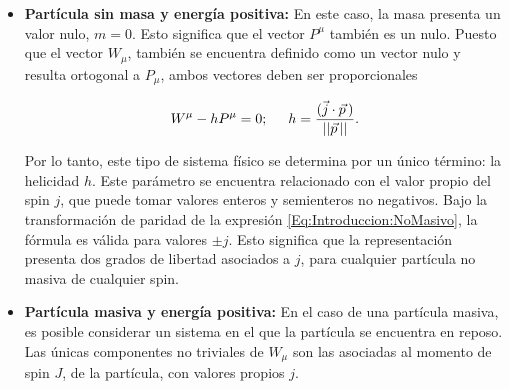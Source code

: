 \begin{itemize}
	\item \textbf{Partícula sin masa y energía positiva:} En este caso, la masa presenta un valor nulo, $m=0$. Esto significa que el vector $P^{\mu}$ también es un nulo. Puesto que el vector $W_{\mu}$, también se encuentra definido como un vector nulo y resulta ortogonal a $P_{\mu}$, ambos vectores deben ser proporcionales
	
		\begin{equation} \label{Eq:Introduccion:NoMasivo}
			W^{\mu} - h P^{\mu} = 0; \hspace{5mm} h =  \frac{ (\vec{j} \cdot \vec{p}\, ) }{ || \vec{p}\, || }.
		\end{equation}
	
	Por lo tanto, este tipo de sistema físico se determina por un único término: la helicidad $h$. Este parámetro se encuentra relacionado con el valor propio del spin $j$, que puede tomar valores enteros y semienteros no negativos. Bajo la transformación de paridad de la expresión \eqref{Eq:Introduccion:NoMasivo}, la fórmula es válida para valores $\pm j$. Esto significa que la representación presenta dos grados de libertad asociados a $j$, para cualquier partícula no masiva de cualquier spin.
	
	\item \textbf{Partícula masiva y energía positiva:} 
	En el caso de una partícula masiva, es posible considerar un sistema en el que la partícula se encuentra en reposo. Las únicas componentes no triviales de $W_{\mu}$ son las asociadas al momento de spin $J$, de la partícula, con valores propios $j$.


\end{itemize}
